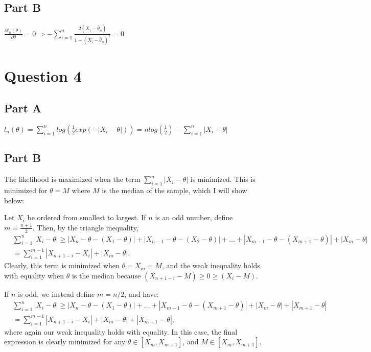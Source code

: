 \documentclass[11pt]{article} %
\begin{document}
\subsection{Part B}
$\frac{\partial l_n(\theta)}{\partial \theta} = 0 \Rightarrow -\sum_{i=1}^n \frac{2(X_i - \hat{\theta}_n)}{1 +(X_i- \hat{\theta}_n)^2 } = 0$
\section{Question 4} %
\subsection{Part A}
$l_n(\theta) = \sum_{i=1}^n log(\frac{1}{2} exp(-|X_i-\theta|)) = n log(\frac{1}{2})  -\sum_{i=1}^n |X_i-\theta|$
\subsection{Part B}
The likelihood is maximized when the term $\sum_{i=1}^n |X_i-\theta|$ is minimized. This is minimized for $\theta = M$ where $M$ is the median of the sample, which I will show below:

Let $X_i$ be ordered from smallest to largest. If $n$ is an odd number, define $m = \frac{n+1}{2}$. Then, by the triangle inequality,
\begin{align*}
&\sum_{i=1}^{n}|X_i - \theta| \geq |X_n - \theta - (X_1 - \theta)| + |X_{n-1} - \theta - (X_2 - \theta)| + \dots + |X_{m-1} - \theta - (X_{m+1} - \theta)| + |X_{m} - \theta| \\&= \sum_{i=1}^{m-1} |X_{n+1-i} - X_i| + |X_m - \theta|.
\end{align*}
Clearly, this term is minimized when $\theta=X_m = M$, and the weak inequality holds with equality when $\theta$ is the median because $(X_{n+1-i} - M)\geq 0 \geq( X_i - M)$.

If $n$ is odd, we instead define $m=n/2$, and have:
\begin{align*}
&\sum_{i=1}^{n}|X_i - \theta| \geq |X_n - \theta - (X_1 - \theta)| + \dots + |X_{m-1} - \theta - (X_{m+1} - \theta)| + |X_{m} - \theta| +  |X_{m+1} - \theta| \\&= \sum_{i=1}^{m-1} |X_{n+1-i} - X_i| + |X_m - \theta| + |X_{m+1} - \theta|,
\end{align*}
where again our weak inequality holds with equality. In this case, the final expression is clearly minimized for any $\theta \in [X_m,X_{m+1}]$, and $M\in [X_m,X_{m+1}]$.
\end{document}
